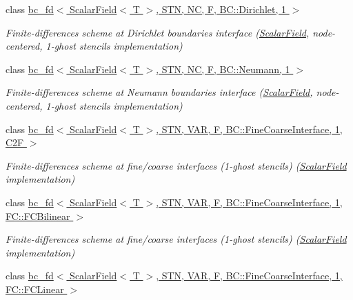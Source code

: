 \begin{DoxyCompactItemize}
class \hyperlink{classUintah_1_1PhaseField_1_1detail_1_1bc__fd_3_01ScalarField_3_01T_01_4_00_01STN_00_01NC_00_01Fc8a6e28ffa258d282d0a921216b0ed9f}{bc\+\_\+fd$<$ Scalar\+Field$<$ T $>$, S\+T\+N, N\+C, F, B\+C\+::\+Dirichlet, 1 $>$}
\begin{DoxyCompactList}\small\item\em Finite-\/differences scheme at Dirichlet boundaries interface (\hyperlink{structUintah_1_1PhaseField_1_1ScalarField}{Scalar\+Field}, node-\/centered, 1-\/ghost stencils implementation) \end{DoxyCompactList}\item 
class \hyperlink{classUintah_1_1PhaseField_1_1detail_1_1bc__fd_3_01ScalarField_3_01T_01_4_00_01STN_00_01NC_00_01F_00_01BC_1_1Neumann_00_011_01_4}{bc\+\_\+fd$<$ Scalar\+Field$<$ T $>$, S\+T\+N, N\+C, F, B\+C\+::\+Neumann, 1 $>$}
\begin{DoxyCompactList}\small\item\em Finite-\/differences scheme at Neumann boundaries interface (\hyperlink{structUintah_1_1PhaseField_1_1ScalarField}{Scalar\+Field}, node-\/centered, 1-\/ghost stencils implementation) \end{DoxyCompactList}\item 
class \hyperlink{classUintah_1_1PhaseField_1_1detail_1_1bc__fd_3_01ScalarField_3_01T_01_4_00_01STN_00_01VAR_00_01efea904a4b4ba4f7ece7ded248f84d17}{bc\+\_\+fd$<$ Scalar\+Field$<$ T $>$, S\+T\+N, V\+A\+R, F, B\+C\+::\+Fine\+Coarse\+Interface, 1, C2\+F $>$}
\begin{DoxyCompactList}\small\item\em Finite-\/differences scheme at fine/coarse interfaces (1-\/ghost stencils) (\hyperlink{structUintah_1_1PhaseField_1_1ScalarField}{Scalar\+Field} implementation) \end{DoxyCompactList}\item 
class \hyperlink{classUintah_1_1PhaseField_1_1detail_1_1bc__fd_3_01ScalarField_3_01T_01_4_00_01STN_00_01VAR_00_01bd5f5aa94f34afad5c8a785ee391ed2b}{bc\+\_\+fd$<$ Scalar\+Field$<$ T $>$, S\+T\+N, V\+A\+R, F, B\+C\+::\+Fine\+Coarse\+Interface, 1, F\+C\+::\+F\+C\+Bilinear $>$}
\begin{DoxyCompactList}\small\item\em Finite-\/differences scheme at fine/coarse interfaces (1-\/ghost stencils) (\hyperlink{structUintah_1_1PhaseField_1_1ScalarField}{Scalar\+Field} implementation) \end{DoxyCompactList}\item 
class \hyperlink{classUintah_1_1PhaseField_1_1detail_1_1bc__fd_3_01ScalarField_3_01T_01_4_00_01STN_00_01VAR_00_01f836207db876ecd28bf65f631f79030f}{bc\+\_\+fd$<$ Scalar\+Field$<$ T $>$, S\+T\+N, V\+A\+R, F, B\+C\+::\+Fine\+Coarse\+Interface, 1, F\+C\+::\+F\+C\+Linear $>$}

\end{DoxyCompactItemize}

